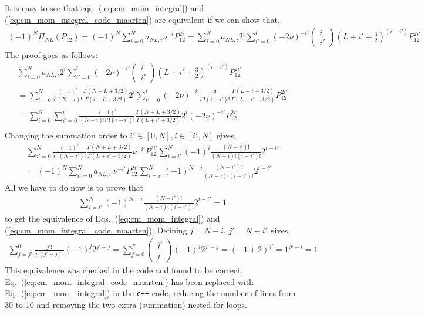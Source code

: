 \documentclass[10pt]{article}
\begin{document}
It is easy to see that eqs.~(\ref{eq:cm_mom_integral}) and 
(\ref{eq:cm_mom_integral_code_maarten}) are equivalent if we can show that,
\begin{align*}
(-1)^{N} \Pi_{NL}(P_{12}) = 
(-1)^{N} \sum_{i=0}^{N}  a_{NL,i}  \nu^{-i} P_{12}^{2i} = \sum_{i=0}^{N} 
a_{NL,i}  2^{i} 
	\sum_{i'=0}^{i}  (-2 \nu)^{-i'}	
	\left( \begin{array}{c} i \\ i' \end{array} \right)
	(L+i'+\frac{3}{2})^{(i-i')}
	 P_{12}^{2i'} 
\end{align*}
The proof goes as follows:
\begin{multline*}
\sum_{i=0}^{N} a_{NL,i}  2^{i} \sum_{i'=0}^{i}  (-2 \nu)^{-i'}\left( 
\begin{array}{c} i \\ i' \end{array} \right) (L+i'+\frac{3}{2})^{(i-i')} 
P_{12}^{2i'} \\
=  \sum_{i=0}^{N} \frac{(-1)^{i}}{i! (N-i)!} \frac{ \Gamma(N+L+3/2) }{ \Gamma(i 
+ L + 3/2)} 2^{i} \sum_{i'=0}^{i}  (-2 \nu)^{-i'} \frac{ i!}{ i'! (i-i')!} 
\frac{\Gamma(L+i+3/2)}{ \Gamma( L + i' + 3/2)} P_{12}^{2i'} \\
= \sum_{i=0}^{N} \sum_{i'=0}^{i} \frac{(-1)^{i}}{ (N-i)! i'! (i-i')!} \frac{ 
\Gamma(N+L+3/2) }{ \Gamma( L + i' + 3/2) } 2^{i}   (-2 \nu)^{-i'} P_{12}^{2i'} 
\\
\end{multline*}
Changing the summation order to $ i' \in [0,N], i \in [i',N]$ gives,
\begin{multline*}
\sum_{i'=0}^{N} \frac{(-1)^{i'}}{ i'! (N-i')!} \frac{ \Gamma(N+L+3/2) }{ 
\Gamma( L + i' + 3/2) } \nu^{-i'} P_{12}^{2i'} \sum_{i=i'}^{N} (-1)^{i} 
\frac{(N-i')!}{(N-i)! (i-i')!} 2^{i-i'}\\
= (-1)^{N} \sum_{i'=0}^{N} a_{NL,i'} \nu^{-i'} P_{12}^{2i'} \sum_{i=i'}^{N} 
(-1)^{N-i} \frac{(N-i')!}{(N-i)! (i-i')!} 2^{i-i'}
\end{multline*}
All we have to do now is to prove that 
\begin{align*}
	\sum_{i=i'}^{N} (-1)^{N-i} \frac{(N-i')!}{(N-i)! (i-i')!} 2^{i-i'} = 1
\end{align*}
to get the equivalence of Eqs.~(\ref{eq:cm_mom_integral}) and 
(\ref{eq:cm_mom_integral_code_maarten}). Defining $j=N-i$, $j'=N-i'$ gives,
\begin{align*}
	\sum_{j=j'}^{0}  \frac{j'!}{j! (j'-j)!} (-1)^{j} 2^{j'-j} = 
\sum_{j=0}^{j'} \left( \begin{array}{c} j' \\ j \end{array} \right) (-1)^{j} 
2^{j'-j} = ( -1 + 2 )^{j'} = 1^{N-i} = 1
\end{align*}
This equivalence was checked in the code and found to be correct. 
Eq.~(\ref{eq:cm_mom_integral_code_maarten}) has been replaced with 
Eq.~(\ref{eq:cm_mom_integral}) in the \texttt{c++} code, reducing the number of 
lines from 30 to 10 and removing the two extra (summation) nested for loops.
\end{document}
